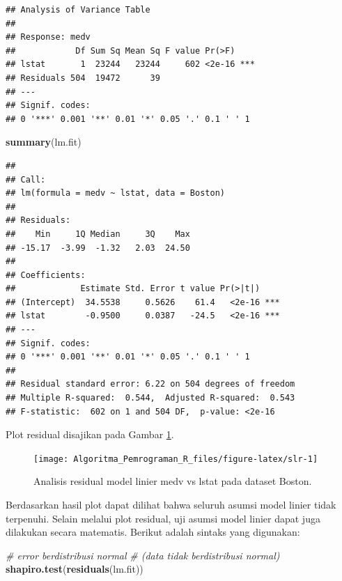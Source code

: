 \documentclass[
]{book}
\newenvironment{Shaded}{\begin{snugshade}}{\end{snugshade}}
\newcommand{\CommentTok}[1]{\textcolor[rgb]{0.56,0.35,0.01}{\textit{#1}}}
\newcommand{\FunctionTok}[1]{\textcolor[rgb]{0.13,0.29,0.53}{\textbf{#1}}}
\newcommand{\NormalTok}[1]{#1}
\theoremstyle{definition}
\theoremstyle{definition}
\theoremstyle{definition}
\theoremstyle{definition}
\theoremstyle{remark}
\begin{document}
\begin{verbatim}
## Analysis of Variance Table
## 
## Response: medv
##            Df Sum Sq Mean Sq F value Pr(>F)    
## lstat       1  23244   23244     602 <2e-16 ***
## Residuals 504  19472      39                   
## ---
## Signif. codes:  
## 0 '***' 0.001 '**' 0.01 '*' 0.05 '.' 0.1 ' ' 1
\end{verbatim}

\begin{Shaded}
\begin{Highlighting}[]
\FunctionTok{summary}\NormalTok{(lm.fit)}
\end{Highlighting}
\end{Shaded}

\begin{verbatim}
## 
## Call:
## lm(formula = medv ~ lstat, data = Boston)
## 
## Residuals:
##    Min     1Q Median     3Q    Max 
## -15.17  -3.99  -1.32   2.03  24.50 
## 
## Coefficients:
##             Estimate Std. Error t value Pr(>|t|)    
## (Intercept)  34.5538     0.5626    61.4   <2e-16 ***
## lstat        -0.9500     0.0387   -24.5   <2e-16 ***
## ---
## Signif. codes:  
## 0 '***' 0.001 '**' 0.01 '*' 0.05 '.' 0.1 ' ' 1
## 
## Residual standard error: 6.22 on 504 degrees of freedom
## Multiple R-squared:  0.544,  Adjusted R-squared:  0.543 
## F-statistic:  602 on 1 and 504 DF,  p-value: <2e-16
\end{verbatim}

Plot residual disajikan pada Gambar \ref{fig:slr}.

\begin{figure}

{\centering \texttt{[image: Algoritma\_Pemrograman\_R\_files/figure-latex/slr-1]} 

}

\caption{Analisis residual model linier medv vs lstat pada dataset Boston.}\label{fig:slr}
\end{figure}

Berdasarkan hasil plot dapat dilihat bahwa seluruh asumsi model linier tidak terpenuhi. Selain melalui plot residual, uji asumsi model linier dapat juga dilakukan secara matematis. Berikut adalah sintaks yang digunakan:

\begin{Shaded}
\begin{Highlighting}[]
\CommentTok{\# error berdistribusi normal }
\CommentTok{\# (data tidak berdistribusi normal)}
\FunctionTok{shapiro.test}\NormalTok{(}\FunctionTok{residuals}\NormalTok{(lm.fit))}
\end{Highlighting}
\end{Shaded}
\end{document}
